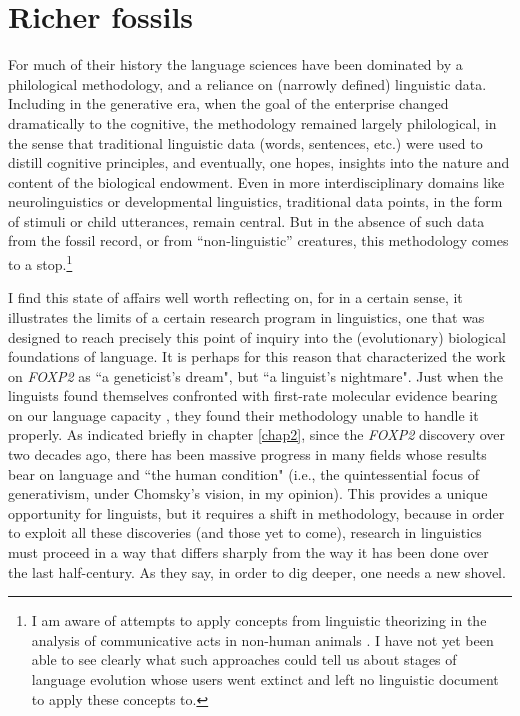 \chapter{Richer fossils}\label{chap4}

For much of their history the language sciences have been dominated by a philological methodology, and a reliance on (narrowly defined) linguistic data. Including in the generative era, when the goal of the enterprise changed dramatically to the cognitive, the methodology remained largely philological, in the sense that traditional linguistic data (words, sentences, etc.) were used to distill cognitive principles, and eventually, one hopes, insights into the nature and content of the biological endowment. Even in more interdisciplinary domains like neurolinguistics or developmental linguistics, traditional data points, in the form of stimuli or child utterances, remain central. But in the absence of such data from the fossil record, or from ``non-linguistic'' creatures, this methodology comes to a stop.\footnote{I am aware of attempts to apply concepts from linguistic theorizing in the analysis of communicative acts in non-human animals \citep{schlenker2016formal,pleyer2020construction}. I have not yet been able to see clearly what such approaches could tell us about stages of language evolution whose users went extinct and left no linguistic document to apply these concepts to.}

I find this state of affairs well worth reflecting on, for in a certain sense, it illustrates the limits of a certain research program in linguistics, one that was designed to reach precisely this point of inquiry into the (evolutionary) biological foundations of language. It is perhaps for this reason that \cite{piattelli2011geneticist} characterized the work on \textit{FOXP2} as ``a geneticist's dream", but ``a linguist's nightmare". Just when the linguists found themselves confronted with first-rate molecular evidence bearing on our language capacity \citep{lai2001forkhead}, they found their methodology unable to handle it properly. As indicated briefly in chapter \ref{chap2}, since the \textit{FOXP2} discovery over two decades ago, there has been massive progress in many fields whose results bear on language and ``the human condition" (i.e.,   the quintessential focus of generativism, under Chomsky's vision, in my opinion). This provides a unique opportunity for linguists, but it requires a shift in methodology, because in order to exploit all these discoveries (and those yet to come), research in linguistics must proceed in a way that differs sharply from the way it has been done over the last half-century. As they say, in order to dig deeper, one needs a new shovel. 

